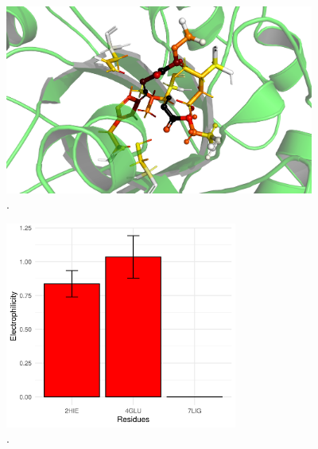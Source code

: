 \documentclass[a4paper,11pt]{refart}
\begin{document}
\hspace*{-\leftmarginwidth}
\begin{minipage}{\fullwidth}
	\begin{figure}[H]
		\begin{center}
			\includegraphics[width=4in]{images/tut6_img11}
			\caption{.}
			\label{fig_tut6_10}
		\end{center}
	\end{figure}
\end{minipage}


\hspace*{-\leftmarginwidth}
\begin{minipage}{\fullwidth}
	\begin{figure}[H]
		\begin{center}
			\includegraphics[width=3in]{images/tut6_img12}
			\caption{.}
			\label{fig_tut6_11}
		\end{center}
	\end{figure}
\end{minipage}
\end{document}
